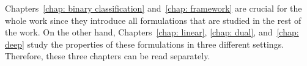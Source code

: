 Chapters~\ref{chap: binary classification} and~\ref{chap: framework} are crucial for the whole work since they introduce all formulations that are studied in the rest of the work. On the other hand, Chapters~\ref{chap: linear}, \ref{chap: dual}, and~\ref{chap: deep} study the properties of these formulations in three different settings. Therefore, these three chapters can be read separately. 
